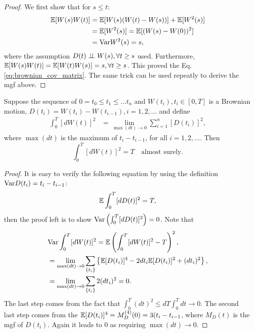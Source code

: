 \begin{proof}
We first show that for $s\le t$:
\begin{equation}
\begin{aligned}
\mathbb{E}[W(s)W(t)]&=\mathbb{E}[W(s)(W(t)-W(s))]+\mathbb{E}[W^2(s)]\\
&=\mathbb{E}[W^2(s)]=\mathbb{E}[(W(s)-W(0))^2]\\
&=\text{Var} W^2(s)=s,
\end{aligned}
\end{equation}
where the assumption $D(t)\perp\!\!\!\perp W(s),\forall t\ge s$ used. Furthermore, $\mathbb{E}[W(s)W(t)]=\mathbb{E}[W(t)W(s)]=s,\forall t\ge s$. This proved the Eq.\ref{eq:brownian_cov_matrix}. The same trick can be used repeatly to derive the mgf above.
\end{proof}

\begin{theorem}
Suppose the sequence of $0=t_0\le t_1\le\dots t_n$ and $W(t_i),t_i\in [0,T]$ is a Brownian motion, $D(t_i)=W(t_i)-W(t_{i-1}),i=1,2,\dots$ and define
\begin{equation}
\begin{aligned}
\int_0^T[dW(t)]^2&=\lim_{\max(dt)\to 0}\sum_{i=1}^n[D(t_i)]^2,
\end{aligned}
\end{equation}
where $\max(dt)$ is the maximum of $t_i-t_{i-1}$, for all $i=1,2,\dots$. Then
\begin{equation}
\int_0^T[dW(t)]^2 = T \quad\text{almost surely.}
\end{equation}
\end{theorem}

\begin{proof}
It is easy to verify the following equation by using the definition $\text{Var} D(t_i)=t_i-t_{i-1}$:
\begin{equation}
\mathbb{E} \int_0^T[dD(t)]^2=T,
\end{equation}
then the proof left is to show $\text{Var}\left(\int_0^T[dD(t)]^2\right)=0$. Note that
\begin{equation*}
\begin{aligned}
&\text{Var}\int_0^T[dW(t)]^2=\mathbb{E}\left(\int_0^T[dW(t)]^2-T\right)^2,\\
&=\lim_{\max(dt)\to0} \sum_{\{t_i\}}\left\{\mathbb{E} [D(t_i)]^4-2dt_i\mathbb{E} [D(t_i)]^2+(dt_i)^2\right\},\\
&=\lim_{\max(dt)\to0} \sum_{\{t_i\}}2(dt_i)^2=0.
\end{aligned}
\end{equation*}
The last step comes from the fact that $\int_0^T (dt)^2\le dT\int_0^T dt\to0$. The second last step comes from the $\mathbb{E} [D(t_i)]^4=M_D^{(4)}(0)=3(t_i-t_{i-1}$, where $M_D(t)$ is the mgf of $D(t_i)$. Again it leads to 0 as requiring $\max(dt)\to0$.
\end{proof}

